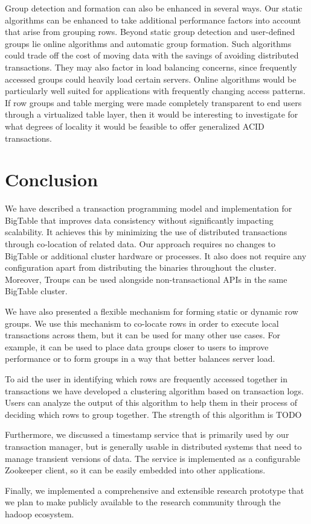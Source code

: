 \documentclass[10pt,final,journal]{IEEEtran}
\begin{document}
Group detection and formation can also be enhanced in several ways. Our static algorithms can be enhanced to take additional performance factors into account that arise from grouping rows. Beyond static group detection and user-defined groups lie online algorithms and automatic group formation. Such algorithms could trade off the cost of moving data with the savings of avoiding distributed transactions. They may also factor in load balancing concerns, since frequently accessed groups could heavily load certain servers. Online algorithms would be particularly well suited for applications with frequently changing access patterns. If row groups and table merging were made completely transparent to end users through a virtualized table layer, then it would be interesting to investigate for what degrees of locality it would be feasible to offer generalized ACID transactions.

\section{Conclusion}
We have described a transaction programming model and implementation for BigTable that improves data consistency without significantly impacting scalability. It achieves this by minimizing the use of distributed transactions through co-location of related data. Our approach requires no changes to BigTable or additional cluster hardware or processes. It also does not require any configuration apart from distributing the binaries throughout the cluster. Moreover, Troups can be used alongside non-transactional APIs in the same BigTable cluster.

We have also presented a flexible mechanism for forming static or dynamic row groups. We use this mechanism to co-locate rows in order to execute local transactions across them, but it can be used for many other use cases. For example, it can be used to place data groups closer to users to improve performance or to form groups in a way that better balances server load.

To aid the user in identifying which rows are frequently accessed together in transactions we have developed a clustering algorithm based on transaction logs. Users can analyze the output of this algorithm to help them in their process of deciding which rows to group together. The strength of this algorithm is TODO

Furthermore, we discussed a timestamp service that is primarily used by our transaction manager, but is generally usable in distributed systems that need to manage transient versions of data. The service is implemented as a configurable Zookeeper client, so it can be easily embedded into other applications.

Finally, we implemented a comprehensive and extensible research prototype that we plan to make publicly available to the research community through the hadoop ecosystem.




\end{document}
